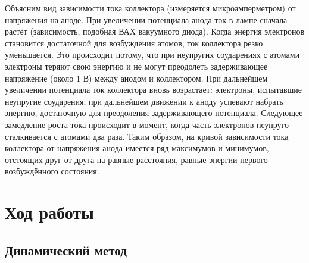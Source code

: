 \documentclass[a4paper,12pt]{article} %
\begin{document}
		Объясним вид зависимости тока коллектора (измеряется микроамперметром) от напряжения на аноде. 
		При увеличении потенциала анода ток в лампе сначала растёт (зависимость, подобная ВАХ вакуумного диода). 
		Когда энергия электронов становится достаточной для возбуждения атомов, ток коллектора резко уменьшается. 
		Это происходит потому, что при неупругих соударениях с атомами электроны теряют свою энергию и не могут преодолеть задерживающее напряжение (около 1 В) между анодом и коллектором. 
		При дальнейшем увеличении потенциала ток коллектора вновь возрастает: электроны, испытавшие неупругие соударения, при дальнейшем движении к аноду успевают набрать энергию, достаточную для преодоления задерживающего потенциала. 
		Следующее замедление роста тока происходит в момент, когда часть электронов неупруго сталкивается с атомами два раза. 
		Таким образом, на кривой зависимости тока коллектора от напряжения анода имеется ряд максимумов и минимумов, отстоящих друг от друга на равные расстояния, равные энергии первого возбуждённого состояния.

	\section{Ход работы}

		\subsection{Динамический метод}
\end{document}
